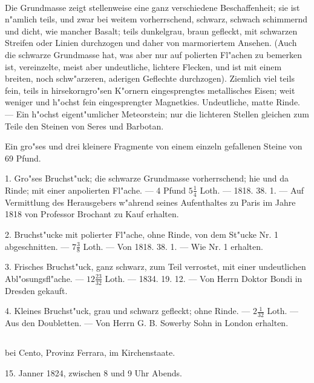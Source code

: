 \documentclass[a4paper, 11pt, oneside, polutonikogreek, german]{article}
\begin{document}
\paragraph{}
Die Grundmasse zeigt stellenweise eine ganz verschiedene Beschaffenheit; sie ist n"amlich teils, und zwar bei weitem vorherrschend, schwarz, schwach schimmernd und dicht, wie mancher Basalt; teils dunkelgrau, braun gefleckt, mit schwarzen Streifen oder Linien durchzogen und daher von marmoriertem Ansehen. (Auch die schwarze Grundmasse hat, was aber nur auf polierten Fl"achen zu bemerken ist, vereinzelte, meist aber undeutliche, lichtere Flecken, und ist mit einem breiten, noch schw"arzeren, aderigen Geflechte durchzogen). Ziemlich viel teils fein, teils in hirsekorngro"sen K"ornern eingesprengtes metallisches Eisen; weit weniger und h"ochst fein eingesprengter Magnetkies. Undeutliche, matte Rinde. --- Ein h"ochst eigent"umlicher Meteorstein; nur die lichteren Stellen gleichen zum Teile den Steinen von Seres und Barbotan.

Ein gro"ses und drei kleinere Fragmente von einem einzeln gefallenen Steine von 69 Pfund.

1. Gro"ses Bruchst"uck; die schwarze Grundmasse vorherrschend; hie und da Rinde; mit einer anpolierten Fl"ache. --- 4 Pfund $5\frac{1}{4}$ Loth. --- 1818. 38. 1. --- Auf Vermittlung des Herausgebers w"ahrend seines Aufenthaltes zu Paris im Jahre 1818 von Professor Brochant zu Kauf erhalten.

2. Bruchst"ucke mit polierter Fl"ache, ohne Rinde, von dem St"ucke Nr. 1 abgeschnitten. --- $7\frac{3}{8}$ Loth. --- Von 1818. 38. 1. --- Wie Nr. 1 erhalten.

3. Frisches Bruchst"uck, ganz schwarz, zum Teil verrostet, mit einer undeutlichen Abl"osungsfl"ache. --- $12\frac{23}{32}$ Loth. --- 1834. 19. 12. --- Von Herrn Doktor Bondi in Dresden gekauft.

4. Kleines Bruchst"uck, grau und schwarz gefleckt; ohne Rinde. --- $2\frac{1}{32}$ Loth. --- Aus den Doubletten. --- Von Herrn G. B. Sowerby Sohn in London erhalten.
\subsection[\frakfamily{Renazzo.}]{}
\begin{center}

bei Cento, Provinz Ferrara, im Kirchenstaate.

15. Janner 1824, zwischen 8 und 9 Uhr Abends.
\end{center}
\end{document}
